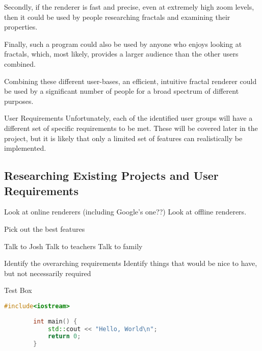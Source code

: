 Secondly, if the renderer is fast and precise, even at extremely high zoom levels, then it could be used by people researching fractals and examining their properties.

Finally, such a program could also be used by anyone who enjoys looking at fractals, which, most likely, provides a larger audience than the other users combined.

Combining these different user-bases, an efficient, intuitive fractal renderer could be used by a significant number of people for a broad spectrum of different purposes.

\vspace{0.5cm}

\begin{greenbox}{User Requirements}
	Unfortunately, each of the identified user groups will have a different set of specific requirements to be met. These will be covered later in the project, but it is likely that only a limited set of features can realistically be implemented.
\end{greenbox}

\subsection{Researching Existing Projects and User Requirements}

Look at online renderers (including Google's one??)
Look at offline renderers.

Pick out the best features

Talk to Josh
Talk to teachers
Talk to family

Identify the overarching requirements
Identify things that would be nice to have, but not necessarily required

\begin{codebox}{Test Box}
	\begin{lstlisting}[language=c++]
		#include<iostream>
		
		int main() {
			std::cout << "Hello, World\n";
			return 0;
		}
	\end{lstlisting}	
\end{codebox}

